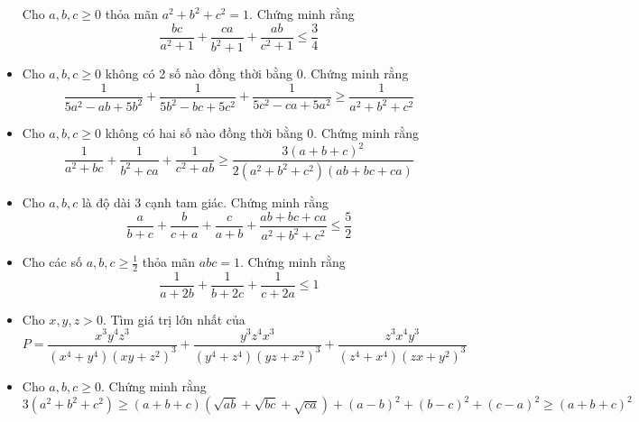 \documentclass[11pt]{scrartcl}
\begin{document}
\begin{itemize}[label=, leftmargin=0em, itemsep=0.5em]
\begin{btvn}
                Cho $a,b,c \geq 0$ thỏa mãn $a^2 + b^2 + c^2 = 1$. Chứng minh rằng
                \[
                    \frac{bc}{a^2 + 1} + \frac{ca}{b^2 + 1} + \frac{ab}{c^2 + 1} \leq \frac{3}{4}
                \]
            \end{btvn}
            \item\begin{btvn}
                Cho $a, b, c \geq 0$ không có 2 số nào đồng thời bằng $0$. Chứng minh rằng
                \[
                    \frac{1}{5a^2 - ab + 5b^2} + \frac{1}{5b^2 - bc + 5c^2} + \frac{1}{5c^2 - ca + 5a^2} \geq \frac{1}{a^2 + b^2 + c^2}
                \]
            \end{btvn}
            \item \begin{btvn}
                Cho $a,b,c \geq 0$ không có hai số nào đồng thời bằng $0$. Chứng minh rằng
                \[
                    \frac{1}{a^2 + bc} + \frac{1}{b^2 + ca} + \frac{1}{c^2 + ab} \geq \frac{3(a + b + c)^2}{2(a^2 + b^2 + c^2)(ab + bc + ca)}
                \]
            \end{btvn}
            \item\begin{btvn}
                Cho $a,b,c$ là độ dài 3 cạnh tam giác. Chứng minh rằng
                \[
                    \frac{a}{b + c} + \frac{b}{c + a} + \frac{c}{a + b} + \frac{ab + bc + ca}{a^2 + b^2 + c^2} \leq \frac{5}{2}
                \]
            \end{btvn}

            \item\begin{btvn}
                Cho các số $a,b,c \geq \frac{1}{2}$ thỏa mãn $abc = 1$. Chứng minh rằng
                \[
                    \frac{1}{a + 2b} + \frac{1}{b + 2c} + \frac{1}{c + 2a} \leq 1
                \]
            \end{btvn}
            
        \item \begin{btvn} Cho $x,y,z >0$. Tìm giá trị lớn nhất của
        \[P=\frac{x^3y^4z^3}{(x^4+y^4)(xy+z^2)^3}+\frac{y^3z^4x^3}{(y^4+z^4)(yz+x^2)^3}+\frac{z^3x^4y^3}{(z^4+x^4)(zx+y^2)^3}\]
        \end{btvn}
        \item \begin{btvn} Cho $a,b,c \geq 0$. Chứng minh rằng
            \[{ 3(a^2+b^2+c^2) \geq (a+b+c)(\sqrt{ab}+\sqrt{bc}+\sqrt{ca})+(a-b)^2+(b-c)^2+(c-a)^2 \geq (a+b+c)^2}\]
            

\end{btvn}
\end{itemize}
\end{document}
